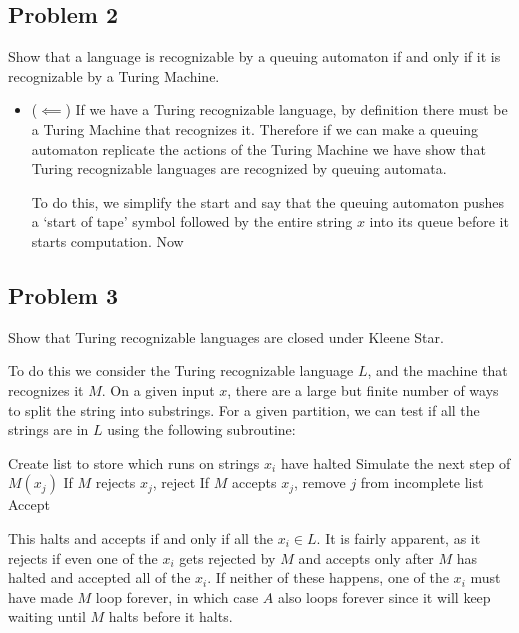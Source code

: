 \documentclass[english]{article}
\begin{document}
\subsection*{Problem 2}
Show that a language is recognizable by a queuing automaton if and only if it
is recognizable by a Turing Machine.
\begin{itemize}
\item ($ \impliedby $) If we have a Turing recognizable language, by
  definition there must be a Turing Machine that recognizes it. Therefore if
  we can make a queuing automaton replicate the actions of the Turing Machine
  we have show that Turing recognizable languages are recognized by queuing
  automata.

  To do this, we simplify the start and say that the queuing automaton pushes
  a `start of tape' symbol followed by the entire string $x$ into its queue before
  it starts computation. Now
\end{itemize}

\subsection*{Problem 3}
Show that Turing recognizable languages are closed under Kleene Star.

To do this we consider the Turing recognizable language $L$, and the machine
that recognizes it $M$.
On a given input $x$, there are a large but finite number of ways to split the
string into substrings. For a given partition, we can test if all the strings
are in $L$ using the following subroutine:
\begin{algorithmic}
\State Create list to store which runs on strings $x_i$ have halted
		\State Simulate the next step of $M(x_j)$
			\State If $M$ rejects $x_j$, reject
			\State If $M$ accepts $x_j$, remove $j$ from incomplete list
		\EndIf
	\EndFor
		\State Accept
	\EndIf
\EndFor
\EndFunction 
\end{algorithmic}

This halts and accepts if and only if all the $x_i \in L$. It is fairly apparent,
as it rejects if even one of the $x_i$ gets rejected by $M$ and accepts only after
$M$ has halted and accepted all of the $x_i$. If neither of these happens,
one of the $x_i$ must have made $M$ loop forever, in which case $A$ also loops
forever since it will keep waiting until $M$ halts before it halts.
\end{document}

